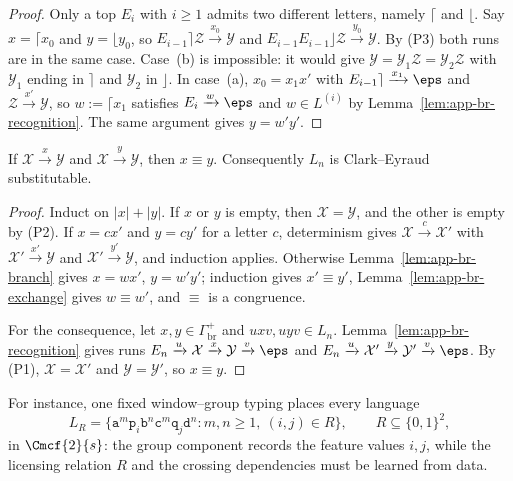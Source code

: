 \begin{proof}
Only a top $E_i$ with $i\ge1$ admits two different letters, namely
$\lceil$ and $\lfloor$. Say $x=\lceil x_0$ and $y=\lfloor y_0$, so
$E_{i-1}\rceil\mathcal Z\xrightarrow{x_0}\mathcal Y$ and
$E_{i-1}E_{i-1}\rfloor\mathcal Z\xrightarrow{y_0}\mathcal Y$. By (P3) both runs
are in the same case. Case~(b) is impossible: it would give
$\mathcal Y=\mathcal Y_1\mathcal Z=\mathcal Y_2\mathcal Z$ with $\mathcal Y_1$ ending in $\rceil$ and
$\mathcal Y_2$ in $\rfloor$. In case~(a), $x_0=x_1x'$ with
$E_{i-1}\rceil\xrightarrow{x_1}\eps$ and $\mathcal Z\xrightarrow{x'}\mathcal Y$, so
$w:=\lceil x_1$ satisfies $E_i\xrightarrow{w}\eps$ and $w\in L^{(i)}$ by
Lemma~\ref{lem:app-br-recognition}. The same argument gives $y=w'y'$.
\end{proof}

\begin{proposition}\label{prop:app-br-congruence}
If $\mathcal X\xrightarrow{x}\mathcal Y$ and $\mathcal X\xrightarrow{y}\mathcal Y$, then
$x\equiv y$. Consequently $L_n$ is Clark--Eyraud substitutable.
\end{proposition}

\begin{proof}
Induct on $|x|+|y|$. If $x$ or $y$ is empty, then $\mathcal X=\mathcal Y$, and the
other is empty by (P2). If $x=cx'$ and $y=cy'$ for a letter $c$,
determinism gives $\mathcal X\xrightarrow{c}\mathcal X'$ with
$\mathcal X'\xrightarrow{x'}\mathcal Y$ and $\mathcal X'\xrightarrow{y'}\mathcal Y$, and
induction applies. Otherwise Lemma~\ref{lem:app-br-branch} gives
$x=wx'$, $y=w'y'$; induction gives $x'\equiv y'$,
Lemma~\ref{lem:app-br-exchange} gives $w\equiv w'$, and $\equiv$ is a
congruence.

For the consequence, let $x,y\in\Gamma_{\mathrm{br}}^+$ and
$uxv,uyv\in L_n$. Lemma~\ref{lem:app-br-recognition} gives runs
$E_n\xrightarrow{u}\mathcal X\xrightarrow{x}\mathcal Y\xrightarrow{v}\eps$ and
$E_n\xrightarrow{u}\mathcal X'\xrightarrow{y}\mathcal Y'\xrightarrow{v}\eps$. By
(P1), $\mathcal X=\mathcal X'$ and $\mathcal Y=\mathcal Y'$, so $x\equiv y$.
\end{proof}

For instance, one fixed window--group typing places
every language
\[
 L_R=\{\mathtt a^m\mathtt p_i\mathtt b^n
       \mathtt c^m\mathtt q_j\mathtt d^n:
       m,n\ge1,\ (i,j)\in R\},\qquad R\subseteq\{0,1\}^2,
\]
in $\Cmcf{2}{s}$: the group component records the feature values $i,j$,
while the licensing relation $R$ and the crossing dependencies must be
learned from data.

